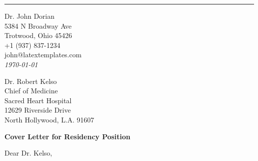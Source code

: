 \documentclass[
	12pt, %
]{letter}
\begin{document}

\vspace*{-1.25cm} %



\vspace{-0.5cm} %

\rule{\linewidth}{1pt} %

\medskip %


\begingroup
	\raggedleft %
	\small %
	Dr. John Dorian \\ %
	5384 N Broadway Ave \\ %
	Trotwood, Ohio 45426 \\
	+1 (937) 837-1234 \\ %
	john@latextemplates.com\\ %
	\bigskip %
	{\normalsize\textit{\today}}\\ %
\endgroup


\begingroup
	Dr. Robert Kelso \\
	Chief of Medicine \\
	Sacred Heart Hospital \\
	12629 Riverside Drive \\
	North Hollywood, L.A. 91607
\endgroup

\bigskip %

\textbf{Cover Letter for Residency Position}

\medskip %

Dear Dr. Kelso,

\smallskip %
\end{document}

